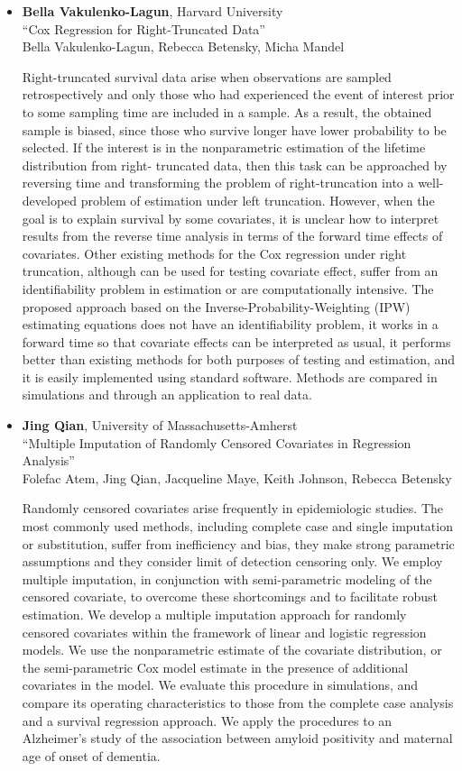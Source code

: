 \begin{itemize}
\item \textbf{Bella Vakulenko-Lagun}, Harvard University \\
``Cox Regression for Right-Truncated Data'' \\
Bella Vakulenko-Lagun, Rebecca Betensky, Micha Mandel


Right-truncated survival data arise when observations are sampled retrospectively and
only those who had experienced the event of interest prior to some sampling time are
included in a sample. As a result, the obtained sample is biased, since those who survive
longer have lower probability to be selected.
If the interest is in the nonparametric estimation of the lifetime distribution from right-
truncated data, then this task can be approached by reversing time and transforming the
problem of right-truncation into a well-developed problem of estimation under left truncation. However, when the goal is to explain survival by some covariates, it is unclear how
to interpret results from the reverse time analysis in terms of the forward time effects of
covariates. Other existing methods for the Cox regression under right truncation, although
can be used for testing covariate effect, suffer from an identifiability problem in estimation
or are computationally intensive.
The proposed approach based on the Inverse-Probability-Weighting (IPW) estimating
equations does not have an identifiability problem, it works in a forward time so that covariate effects can be interpreted as usual, it performs better than existing methods for both purposes of testing and estimation, and it is easily implemented using standard software.
Methods are compared in simulations and through an application to real data.

\item \textbf{Jing Qian}, University of Massachusetts-Amherst \\
``Multiple Imputation of Randomly Censored Covariates in Regression Analysis'' \\
Folefac Atem, Jing Qian, Jacqueline Maye, Keith Johnson, Rebecca Betensky


Randomly censored covariates arise frequently in epidemiologic studies. The most commonly used  methods, including complete case and single imputation or substitution, suffer from inefficiency and bias, they make strong parametric assumptions and they consider limit of detection censoring only.  We employ multiple imputation, in conjunction with semi-parametric modeling of the censored covariate, to overcome these shortcomings and to facilitate robust estimation. We develop a multiple imputation approach for randomly censored covariates within the framework of linear and logistic regression models.  We use the nonparametric estimate of the covariate distribution, or the semi-parametric Cox model estimate in the presence of additional covariates in the model.  We evaluate this procedure in simulations, and compare its operating characteristics to those from the complete case analysis and a survival regression approach.  We apply the procedures to an Alzheimer’s study of the association between amyloid positivity and maternal age of onset of dementia.

\end{itemize}

